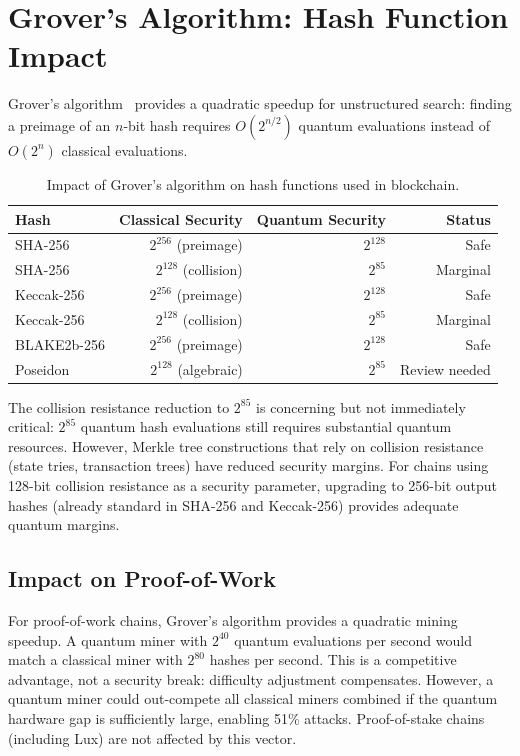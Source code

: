 \section{Grover's Algorithm: Hash Function Impact}

\label{sec:grover}

Grover's algorithm~\cite{grover1996} provides a quadratic speedup for unstructured
search: finding a preimage of an $n$-bit hash requires $O(2^{n/2})$ quantum
evaluations instead of $O(2^n)$ classical evaluations.

\begin{table}[ht]
\centering
\caption{Impact of Grover's algorithm on hash functions used in blockchain.}
\label{tab:grover-impact}
\begin{tabular}{lrrr}
\toprule
\textbf{Hash} & \textbf{Classical Security} & \textbf{Quantum Security} & \textbf{Status} \\
\midrule
SHA-256 & $2^{256}$ (preimage) & $2^{128}$ & Safe \\
SHA-256 & $2^{128}$ (collision) & $2^{85}$ & Marginal \\
Keccak-256 & $2^{256}$ (preimage) & $2^{128}$ & Safe \\
Keccak-256 & $2^{128}$ (collision) & $2^{85}$ & Marginal \\
BLAKE2b-256 & $2^{256}$ (preimage) & $2^{128}$ & Safe \\
Poseidon & $2^{128}$ (algebraic) & $2^{85}$ & Review needed \\
\bottomrule
\end{tabular}
\end{table}

The collision resistance reduction to $2^{85}$ is concerning but not immediately
critical: $2^{85}$ quantum hash evaluations still requires substantial quantum
resources. However, Merkle tree constructions that rely on collision resistance
(state tries, transaction trees) have reduced security margins. For chains using
128-bit collision resistance as a security parameter, upgrading to 256-bit output
hashes (already standard in SHA-256 and Keccak-256) provides adequate quantum margins.

\subsection{Impact on Proof-of-Work}

For proof-of-work chains, Grover's algorithm provides a quadratic mining speedup. A
quantum miner with $2^{40}$ quantum evaluations per second would match a classical
miner with $2^{80}$ hashes per second. This is a competitive advantage, not a
security break: difficulty adjustment compensates. However, a quantum miner could
out-compete all classical miners combined if the quantum hardware gap is sufficiently
large, enabling 51\% attacks. Proof-of-stake chains (including Lux) are not affected
by this vector.

